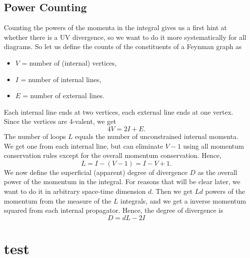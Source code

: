 \documentclass[12pt]{article}
\begin{document}
\subsection{Power Counting}

Counting the powers of the momenta in the integral gives us a first
hint at whether there is a UV divergence, so we want to do it more
systematically for all diagrams. So let us define the counts of the
constituents of a Feynman graph as
\begin{itemize}
\item $V$ = number of (internal) vertices,
\item $I$ = number of internal lines,
\item $E$ = number of external lines.
\end{itemize}
Each internal line ends at two vertices, each external line ends at
one vertex. Since the vertices are 4-valent, we get
\begin{equation}
  4V = 2I + E.
\end{equation}
The number of loops $L$ equals the number of unconstrained internal
momenta. We get one from each internal line, but can eliminate $V-1$
using all momentum conservation rules except for the overall momentum
conservation. Hence,
\begin{equation}
  L = I - (V-1) = I - V + 1.
\end{equation}
We now define the superficial (apparent) degree of divergence $D$ as
the overall power of the momentum in the integral. For reasons that
will be clear later, we want to do it in arbitrary space-time
dimension $d$. Then we get $Ld$ powers of the momentum from the
measure of the $L$ integrals, and we get a inverse momentum squared
from each internal propagator. Hence, the degree of divergence is
\begin{equation}
  D = dL - 2I
\end{equation}



\newpage
\appendix

\section{test}



 
\renewcommand{\refname}{Bibliography}

\end{document}
